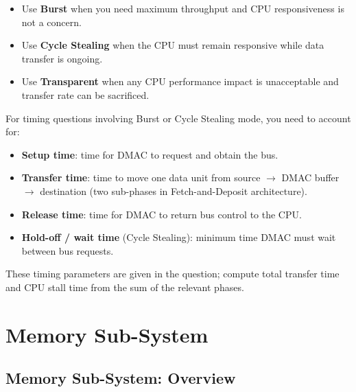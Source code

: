 \documentclass[11pt, a4paper, notitlepage]{report}
\theoremstyle{definition}
\theoremstyle{remark}
\theoremstyle{definition}
\begin{document}
\begin{keyresult}[title={Key Result: DMA Mode Selection}]
  \begin{itemize}[nosep]
    \item Use \textbf{Burst} when you need maximum throughput and CPU responsiveness is not a concern.
    \item Use \textbf{Cycle Stealing} when the CPU must remain responsive while data transfer is ongoing.
    \item Use \textbf{Transparent} when any CPU performance impact is unacceptable and transfer rate can be sacrificed.
  \end{itemize}
\end{keyresult}

\begin{examtip}[title={Exam Tip: Timing Diagram Calculations for DMA}]
  For timing questions involving Burst or Cycle Stealing mode, you need to account for:
  \begin{itemize}[nosep]
    \item \textbf{Setup time}: time for DMAC to request and obtain the bus.
    \item \textbf{Transfer time}: time to move one data unit from source $\to$ DMAC buffer $\to$ destination (two sub-phases in Fetch-and-Deposit architecture).
    \item \textbf{Release time}: time for DMAC to return bus control to the CPU.
    \item \textbf{Hold-off / wait time} (Cycle Stealing): minimum time DMAC must wait between bus requests.
  \end{itemize}
  These timing parameters are given in the question; compute total transfer time and CPU stall time from the sum of the relevant phases.
\end{examtip}

\chapter{Memory Sub-System}
\label{ch:week9-memory}

\section{Memory Sub-System: Overview}
\label{ch:memory-overview}
\end{document}
